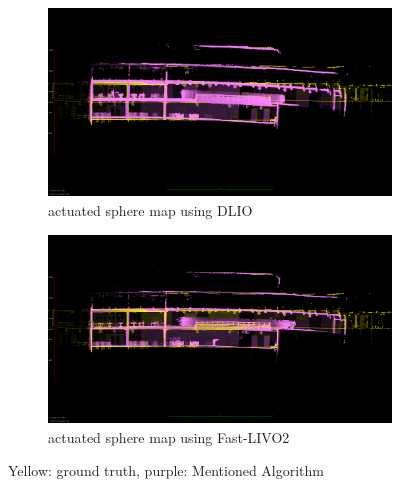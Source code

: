 \documentclass[conference]{IEEEtran}
\begin{document}
\begin{figure}
\centering
\begin{subfigure}{0.48\columnwidth}
    \centering
    \includegraphics[width=\textwidth]{pics/drifts_bending/dlio_bending.png}
    \caption{actuated sphere map using DLIO}\label{fig:dlio_bending}
    \end{subfigure}
\begin{subfigure}{0.48\columnwidth}
    \centering
    \includegraphics[width=\textwidth]{pics/drifts_bending/livo_actuated_bending.png}
    \caption{actuated sphere map using Fast-LIVO2}\label{fig:livo_bending}
\end{subfigure}
\hfill
\caption{Yellow: ground truth, purple: Mentioned Algorithm}
\label{fig:bending}
\end{figure}
\end{document}
